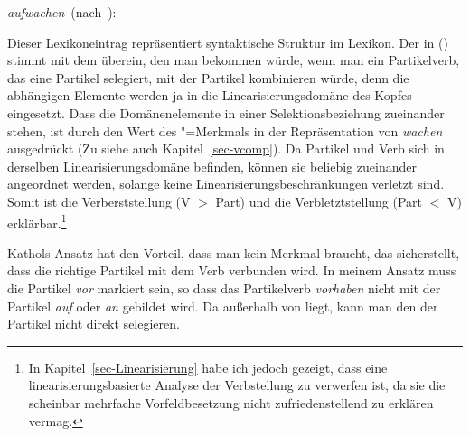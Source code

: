 \eas
\label{le-aufwachen-kathol}
\mbox{\emph{aufwachen} (nach \citet[]{Kathol95a}):}\\
\zs

\noindent
Dieser Lexikoneintrag repräsentiert syntaktische Struktur im Lexikon.
Der \domw in () stimmt mit dem \domw überein, den man bekommen würde,
wenn man ein Partikelverb, das eine Partikel selegiert, mit der Partikel kombinieren
würde, denn die abhängigen Elemente werden ja in die Linearisierungsdomäne
des Kopfes eingesetzt. Dass die Domänenelemente in einer Selektionsbeziehung zueinander stehen,
ist durch den Wert des \vcomp"=Merkmals in der Repräsentation von \emph{wachen} ausgedrückt
(Zu \vcomp siehe auch Kapitel~\ref{sec-vcomp}).
Da Partikel und Verb sich in derselben Linearisierungsdomäne befinden, können sie beliebig
zueinander angeordnet werden, solange keine Linearisierungsbeschränkungen verletzt sind. Somit
ist die Verberststellung (V $>$ Part) und die Verbletztstellung (Part $<$ V) erklärbar.\footnote{
  In Kapitel~\ref{sec-Linearisierung} habe ich jedoch gezeigt, dass eine linearisierungsbasierte
  Analyse der Verbstellung zu verwerfen ist, da sie die scheinbar mehrfache Vorfeldbesetzung nicht
  zufriedenstellend zu erklären vermag.%
}

Kathols Ansatz hat den Vorteil, dass man kein Merkmal braucht, das sicherstellt, dass
die richtige Partikel mit dem Verb verbunden wird. In meinem Ansatz muss die
Partikel \emph{vor} markiert sein, so dass das Partikelverb \emph{vorhaben} nicht mit der
Partikel \emph{auf} oder \emph{an} gebildet wird. Da \phon außerhalb von \synsem liegt,
kann man den \phonw der Partikel nicht direkt selegieren.

